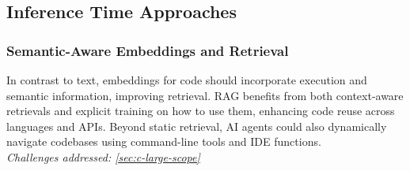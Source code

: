 







\subsection{Inference Time Approaches}

\subsubsection{Semantic-Aware Embeddings and Retrieval} \label{sec:directions-retrieval}

\begin{tcolorbox}[colback=lightorange, boxrule=0pt, arc=5pt, outer arc=5pt]
In contrast to text, embeddings for code should incorporate execution and semantic information, improving retrieval. RAG benefits from both context-aware retrievals and explicit training on how to use them, enhancing code reuse across languages and APIs. Beyond static retrieval, AI agents could also dynamically navigate codebases using command-line tools and IDE functions.
\newline \\
\textit{Challenges addressed: \ref{sec:c-large-scope}}
\end{tcolorbox}


